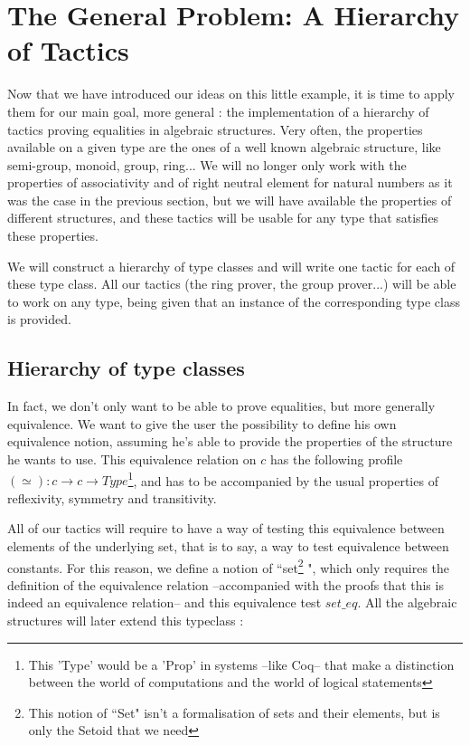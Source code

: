 \section{The General Problem: A Hierarchy of Tactics}

\label{sect:general}

Now that we have introduced our ideas on this little example, it is time to apply them for our main goal, more general : the implementation of a hierarchy of tactics proving equalities in algebraic structures. Very often, the properties available on a given type are the ones of a well known algebraic structure, like semi-group, monoid, group, ring...  We will no longer only work with the properties of associativity and of right neutral element for natural numbers as it was the case in the previous section, but we will have available the properties of different structures, and these tactics will be usable for any type that satisfies these properties.

We will construct a hierarchy of type classes and will write one tactic for each of these type class. All our tactics (the ring prover, the group prover...) will be able to work on any type, being given that an instance of the corresponding type class is provided.

\subsection {Hierarchy of type classes}

In fact, we don't only want to be able to prove equalities, but more generally equivalence. We want to give the user the possibility to define his own equivalence notion, assuming he's able to provide the properties of the structure he wants to use. This equivalence relation on $c$ has the following profile $(\simeq) : c \rightarrow c \rightarrow Type$\footnote{This 'Type' would be a 'Prop' in systems --like Coq-- that make a distinction between the world of computations and the world of logical statements}, and has to be accompanied by the usual properties of reflexivity, symmetry and transitivity.

All of our tactics will require to have a way of testing this equivalence between elements of the underlying set, that is to say, a way to test equivalence between constants. For this reason, we define a notion of ``set\footnote{This notion of ``Set" isn't a formalisation of sets and their elements, but is only the Setoid that we need} ", which only requires the definition of the equivalence relation --accompanied with the proofs that this is indeed an equivalence relation-- and this equivalence test $set\_eq$. All the algebraic structures will later extend this typeclass :

